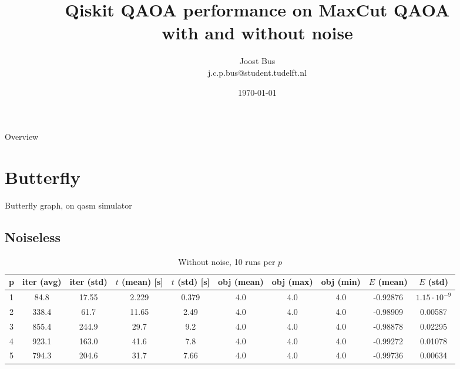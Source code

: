 \documentclass{beamer}
\title[]{Qiskit QAOA performance on MaxCut QAOA \\ with and without noise}
\institute[]{Technische Universiteit Delft, Nederland}
\author{Joost Bus \\ \tiny{j.c.p.bus@student.tudelft.nl}}
\date{\today}
\begin{document}
{
\frame{\titlepage}
}
{}

\begin{frame}{Overview}
\tableofcontents
\end{frame}

\section{Butterfly}
\begin{frame}{Butterfly graph, on qasm simulator}

\subsection{Noiseless}
\begin{table}
	\begin{center}
		
		\begin{adjustbox}{width=\textwidth}
		\begin{tabular}{||c c c c c c c c c c||} 
			\hline
			p & iter (avg) & iter (std) & $t$ (mean) [s] & $t$ (std) [s] & obj (mean) & obj (max) & obj (min) & $E$ (mean) & $E$ (std) \\ [0.5ex] 
			\hline\hline
			1 & 84.8 & 17.55 & 2.229 & 0.379 & 4.0 & 4.0 & 4.0 & -0.92876 & $1.15\cdot 10^{-9}$\\ 
			\hline
			2 & 338.4 & 61.7 & 11.65 & 2.49  & 4.0 & 4.0 & 4.0 & -0.98909 & 0.00587 \\
			\hline
			3 & 855.4 & 244.9 & 29.7 & 9.2  & 4.0 & 4.0 & 4.0 & -0.98878 & 0.02295 \\
			\hline
			4 & 923.1 & 163.0 & 41.6 & 7.8  & 4.0 & 4.0 & 4.0 & -0.99272 & 0.01078 \\
			\hline
			5 & 794.3 & 204.6 & 31.7 & 7.66  & 4.0 & 4.0 & 4.0 & -0.99736 & 0.00634 \\ [1ex] 
			\hline
		\end{tabular}
		\end{adjustbox}
	\end{center}
\caption{Without noise, 10 runs per $p$}
\end{table}


\end{frame}
\end{document}
